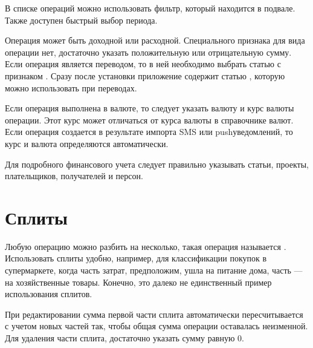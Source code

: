 \documentclass[a4paper,10pt,russian]{sphinxmanual}
\begin{document}
\noindent{}

\sphinxAtStartPar
В списке операций можно использовать фильтр, который находится в подвале. Также доступен быстрый выбор периода.

\noindent{}

\noindent{}

\noindent{}

\sphinxAtStartPar
Операция может быть доходной или расходной. Специального признака для вида операции нет, достаточно указать
положительную или отрицательную сумму. Если операция является переводом, то в ней необходимо выбрать статью
с признаком . Сразу после установки приложение содержит статью ,
которую можно использовать при переводах.

\sphinxAtStartPar
Если операция выполнена в валюте, то следует указать валюту и курс валюты операции. Этот курс может отличаться
от курса валюты в справочнике валют. Если операция создается в результате импорта SMS или push\sphinxhyphen{}уведомлений, то
курс и валюта определяются автоматически.

\sphinxAtStartPar
Для подробного финансового учета следует правильно указывать статьи, проекты, плательщиков, получателей и персон.


\section{Сплиты}
\label{\detokenize{transactions:id3}}
\sphinxAtStartPar
Любую операцию можно разбить на несколько, такая операция называется {\hyperref[\detokenize{glossary:term-0}]{}}. Использовать сплиты удобно, например,
для классификации покупок в супермаркете, когда часть затрат, предположим, ушла на питание дома, часть — на
хозяйственные товары. Конечно, это далеко не единственный пример использования сплитов.

\sphinxAtStartPar
При редактировании сумма первой части сплита автоматически пересчитывается с учетом новых частей так, чтобы
общая сумма операции оставалась неизменной. Для удаления части сплита, достаточно указать сумму равную 0.
\end{document}
